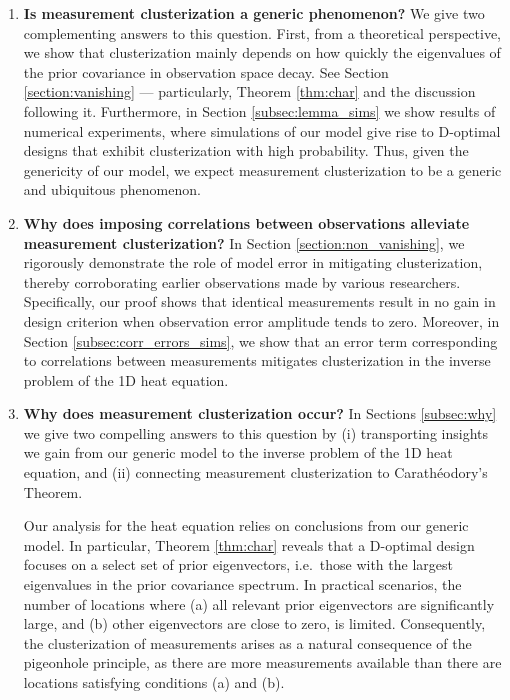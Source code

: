 \documentclass[ba]{imsart}
\theoremstyle{plain}
\theoremstyle{definition}
\theoremstyle{remark}
\begin{document}
\begin{enumerate}
\item \label{q:generic} \textbf{Is measurement clusterization a
  generic phenomenon?}
We give two complementing answers to this question. First, from a
  theoretical perspective, we show that clusterization mainly depends
  on how quickly the eigenvalues of the prior covariance in
  observation space decay.
See Section \ref{section:vanishing} --- particularly, Theorem
  \ref{thm:char} and the discussion following it. Furthermore, in
  Section \ref{subsec:lemma_sims} we show results of numerical
  experiments, where simulations of our model give rise to D-optimal
  designs that exhibit clusterization with high probability. Thus,
  given the genericity of our model, we expect measurement
  clusterization to be a generic and ubiquitous phenomenon.

\item \label{q:mitigate} \textbf{Why does imposing correlations
  between observations alleviate measurement clusterization?} In
  Section \ref{section:non_vanishing}, we rigorously demonstrate the
  role of model error in mitigating clusterization, thereby
  corroborating earlier observations made by various
  researchers. Specifically, our proof shows that identical
  measurements result in no gain in design criterion when observation
  error amplitude tends to zero. Moreover, in Section
  \ref{subsec:corr_errors_sims}, we show that an error term
  corresponding to correlations between measurements mitigates
  clusterization in the inverse problem of the 1D heat equation.

\item \label{q:why} \textbf{Why does measurement clusterization
  occur?} In Sections \ref{subsec:why} we give two compelling answers
  to this question by (i) transporting insights we gain from our
  generic model to the inverse problem of the 1D heat equation, and
  (ii) connecting measurement clusterization to Carath\'eodory's
  Theorem.

  Our analysis for the heat equation relies on conclusions from our
  generic model. In particular, Theorem \ref{thm:char} reveals that a
  D-optimal design focuses on a select set of prior eigenvectors,
  i.e.~those with the largest eigenvalues in the prior covariance
  spectrum. In practical scenarios, the number of locations where (a)
  all relevant prior eigenvectors are significantly large, and (b)
  other eigenvectors are close to zero, is limited. Consequently, the
  clusterization of measurements arises as a natural consequence of
  the pigeonhole principle, as there are more measurements available
  than there are locations satisfying conditions (a) and (b).


\end{enumerate}
\end{document}
